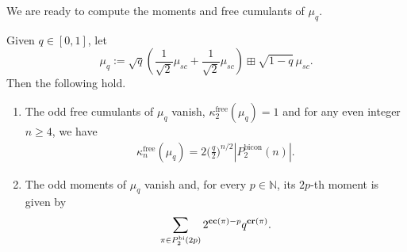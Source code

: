 \documentclass[12pt,reqno]{amsart}
\theoremstyle{plain}
\newcommand{\1}{\mathbf{1}}
\newcommand{\N}{\mathbb{N}}
\newcommand{\cumuf}{\kappa^{\operatorname{free}}}
\newcommand{\crblocks}{\operatorname{\bf cr}}
\newcommand{\ccblocks}{\operatorname{\bf cc}}
\begin{document}
We are ready to compute the moments and free cumulants of $\mu_q$.
\begin{proposition}\label{prop: moments of mu_q}
Given $q\in [0,1]$, let   
    \begin{equation*}
        \mu_q:=\sqrt{q}\left(\frac{1}{\sqrt{2}}\mu_{sc}+\frac{1}{\sqrt{2}}\mu_{sc}\right)\boxplus\sqrt{1-q}\, \mu_{sc}.
    \end{equation*}
Then the following hold.
    \begin{enumerate}
        \item The odd free cumulants of $\mu_q$ vanish, $\cumuf_2(\mu_q)=1$ and for any even integer $n \ge 4$, we have
        \begin{align*}
            \cumuf_n(\mu_q)=2\Big(\frac{q}{2}\Big)^{n/2}|P_2^{\operatorname{bicon}}(n)|.
        \end{align*}
         \item The odd moments of $\mu_q$ vanish and, for every $p\in \N$, its $2p$-th moment is given by  
        \begin{align*}
       \sum_{\pi \in P_2^{\operatorname{bi}}(2p)}2^{\ccblocks(\pi)-p}q^{\crblocks(\pi)}.
        \end{align*}
    \end{enumerate}
\end{proposition}
\end{document}
